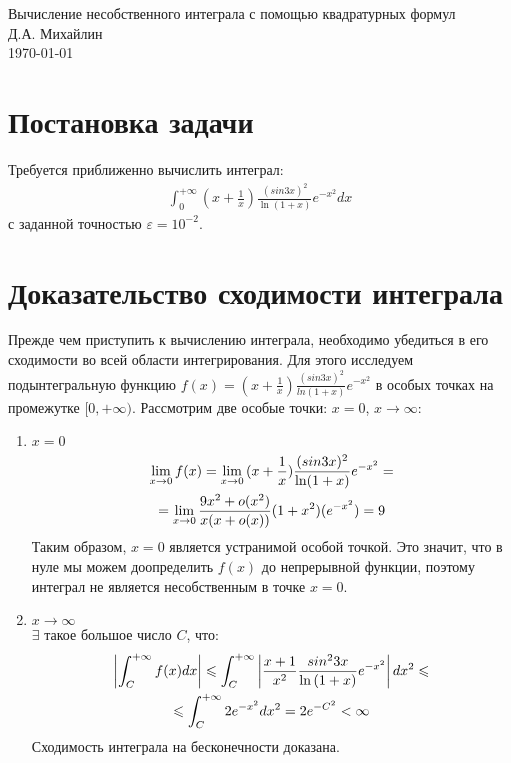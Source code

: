 \documentclass[titlepage]{article}
\def\l{\left}
\def\r{\right}
\def\le{\leqslant}
\begin{document}
 

\newtheorem{theorem}{Теорема}
\newtheorem{lemma}{Лемма}
\newtheorem{definition}{Определение}
\renewcommand{\proofname}{Доказательство}

\begin{center}
\hfill \break
\hfill \break
\hfill \break
\LARGE Вычисление несобственного интеграла с помощью квадратурных формул \\
\hfill \break
\large Д.А. Михайлин \\
\hfill \break
\today \\

\end{center}

\section{Постановка задачи}
Требуется приближенно вычислить интеграл: 
\begin{gather}
	\int_{0}^{+\infty}(x + \frac{1}{x})\frac{(sin{3x})^2}{\ln(1 + x)}e^{-x^2}dx
\end{gather}
с заданной точностью $\varepsilon = 10^{-2}$.

\section{Доказательство сходимости интеграла}
Прежде чем приступить к вычислению интеграла, необходимо убедиться в его сходимости во всей области интегрирования. Для этого исследуем подынтегральную функцию $f(x) = (x + \frac{1}{x})\frac{(sin{3x})^2}{ln(1 + x)}e^{-x^2}$ в особых точках на промежутке $[0, +\infty)$. Рассмотрим две особые точки: $x = 0$,  $x \to \infty$:

\begin{enumerate}
	\item $x = 0$ \\
	\begin{gather}
		\notag \lim_{x \to 0}{f(x)} = \lim_{x \to 0}{(x + \frac{1}{x})\frac{(sin{3x})^2}{\ln(1 + x)}e^{-x^2}} = \\
		\notag = \lim_{x \to 0}{\frac{9x^2 + o(x^2)}{x(x + o(x))}(1 + x^2)(e^{-x^2})} = 9
	\end{gather}
	Таким образом, $x = 0$ является устранимой особой точкой. Это значит, что в нуле мы можем доопределить $f(x)$ до непрерывной функции, поэтому интеграл не является несобственным в точке $x = 0$.
\item $x \to \infty$ \\
	
	$\exists$ такое большое число $C$, что:
	\begin{gather}
		\notag \l| \int_{C}^{+\infty}{f(x)dx} \r| \le \int_{C}^{+\infty}{\l| \frac{x + 1}{x^2}\frac{sin^2{3x}}{\ln{(1+x)}}e^{-x^2}\r|dx^2} \le \\ \notag \le\int_{C}^{+\infty}{ 2e^{-x^2} dx^2} = 2e^{-C^2} < \infty
	\end{gather}
Сходимость интеграла на бесконечности доказана.
\end{enumerate}
\end{document}
